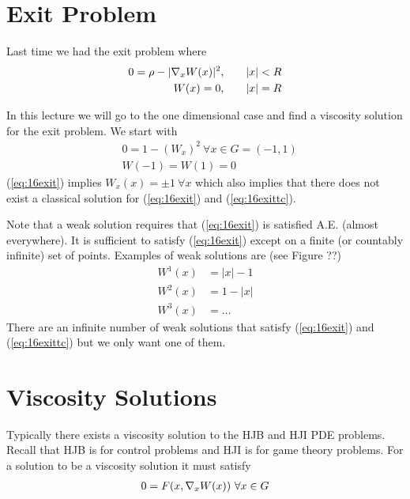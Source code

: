 
\mainmatter
\setcounter{page}{1}

\lectureseries[\course]{\course}

\date{November 24, 2009}

\setaddress

\setcounter{lecture}{15}
\setcounter{chapter}{15}


\section{Exit Problem}
Last time we had the exit problem where
\begin{align*}
0 = \rho - |\nabla_xW(x)|^2, &\qquad |x|<R \\
W(x) = 0, &\qquad |x|=R
\end{align*}

In this lecture we will go to the one dimensional case and find a viscosity solution for the exit problem. We start with
\begin{align}
\label{eq:16exit}
&0 = 1-(W_x)^2 ~\forall x\in G=(-1,1) \\
\label{eq:16exittc}
&W(-1) = W(1) = 0
\end{align}
(\ref{eq:16exit}) implies $W_x(x)=\pm1 ~\forall x$ which also implies that there does not exist a classical solution for (\ref{eq:16exit}) and (\ref{eq:16exittc}).

Note that a weak solution requires that (\ref{eq:16exit}) is satisfied A.E. (almost everywhere). It is sufficient to satisfy (\ref{eq:16exit}) except on a finite (or countably infinite) set of points. Examples of weak solutions are (see Figure ??)
\begin{align*}
W^1(x) &= |x|-1 \\
W^2(x) &= 1-|x| \\
W^3(x) &= \ldots
\end{align*}
There are an infinite number of weak solutions that satisfy (\ref{eq:16exit}) and (\ref{eq:16exittc}) but we only want one of them.

\section{Viscosity Solutions}
Typically there exists a viscosity solution to the HJB and HJI PDE problems. Recall that HJB is for control problems and HJI is for game theory problems. For a solution to be a viscosity solution it must satisfy
\begin{align}
\label{eq:16vsf}
0 = F(x,\nabla_xW(x)) ~\forall x\in G
\end{align}

